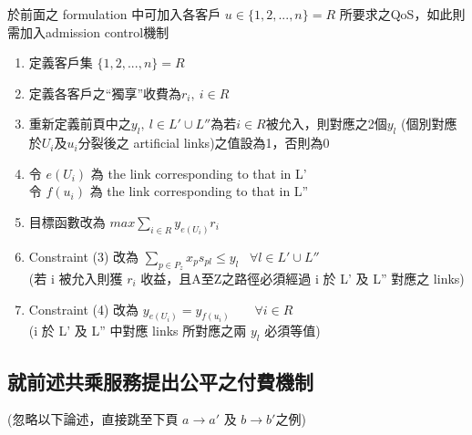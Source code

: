 \documentclass{article}
\begin{document}
於前面之 formulation 中可加入各客戶 \(u \in \{1,2,...,n\} = R\) 所要求之QoS，如此則需加入admission control機制

\begin{enumerate}
\def\labelenumi{\arabic{enumi}.}
  \item 定義客戶集 $\{1,2,...,n\} = R$
  \item 定義各客戶之“獨享”收費為$r_i,\ i \in R$
  \item 重新定義前頁中之$y_l,\ l \in L' \cup L''$為若$i \in R$被允入，則對應之2個$y_l$ (個別對應於$U_i$及$u_i$分裂後之 artificial links)之值設為1，否則為0
  \item 令 $e(U_i)$ 為 the link corresponding to that in L' \\
        令 $f(u_i)$ 為 the link corresponding to that in L''
  \item 目標函數改為 $max \sum\limits_{i \in R} y_{e(U_i)} r_i$
  \item Constraint (3) 改為 $\sum_{p \in P_z} x_p s_{pl} \leq y_l \hspace{10pt} \forall l \in L' \cup L''$ \\
        (若 i 被允入則獲 $r_i$ 收益，且A至Z之路徑必須經過 i 於 L' 及 L'' 對應之 links)
  \item Constraint (4) 改為 $y_{e(U_i)} = y_{f(u_i)} \hspace{23pt} \forall i \in R$ \\
        (i 於 L' 及 L'' 中對應 links 所對應之兩 $y_l$ 必須等值)
\end{enumerate}

\newpage
\subsection*{就前述共乘服務提出公平之付費機制}
(忽略以下論述，直接跳至下頁 $a \rightarrow a'$ 及 $b \rightarrow b' 之例$)
\end{document}
